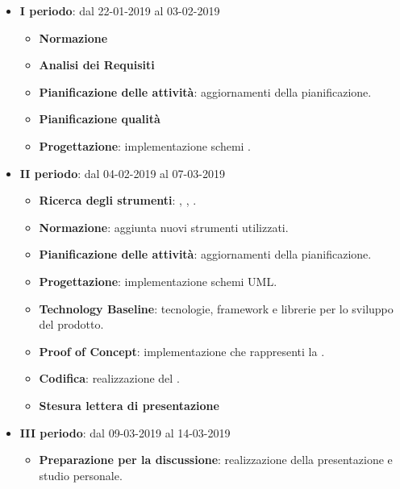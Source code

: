 		\begin{itemize}
			\item \textbf{I periodo}: dal 22-01-2019 al 03-02-2019
			\begin{itemize}
    	        \item \textbf{Normazione}
    	        \item \textbf{Analisi dei Requisiti}
    	        \item \textbf{Pianificazione delle attività}: aggiornamenti della pianificazione.
    	        \item \textbf{Pianificazione qualità}
    	        \item \textbf{Progettazione}: implementazione schemi .
        	\end{itemize}
			\item \textbf{II periodo}: dal 04-02-2019 al 07-03-2019
			\begin{itemize}
				\item \textbf{Ricerca degli strumenti}: , , .
    	        \item \textbf{Normazione}: aggiunta nuovi strumenti utilizzati.
    	        \item \textbf{Pianificazione delle attività}: aggiornamenti della pianificazione.
    	        \item \textbf{Progettazione}: implementazione schemi UML.
    	        \item \textbf{Technology Baseline}: tecnologie, framework e librerie per lo sviluppo del prodotto.
    	        \item \textbf{Proof of Concept}: implementazione che rappresenti la .
    	        \item \textbf{Codifica}: realizzazione del .
    	        \item \textbf{Stesura lettera di presentazione}
        	\end{itemize}
        	\item \textbf{III periodo}: dal 09-03-2019 al 14-03-2019
			\begin{itemize}
				\item \textbf{Preparazione per la discussione}: realizzazione della presentazione e studio personale.
        	\end{itemize}
		\end{itemize}
        
